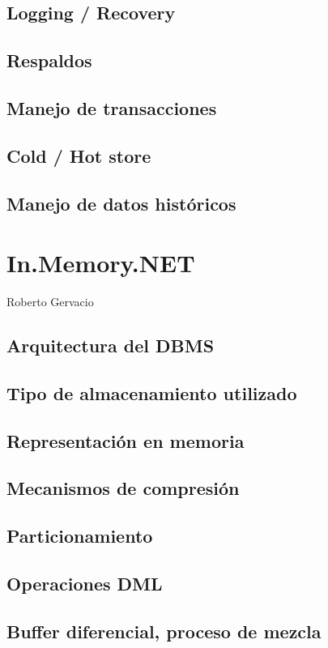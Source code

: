 \documentclass{acmart}
\begin{document}
\subsection{Logging / Recovery}
\subsection{Respaldos}
\subsection{Manejo de transacciones}
\subsection{Cold / Hot store}
\subsection{Manejo de datos históricos}
\newpage

\section{In.Memory.NET}
Roberto Gervacio
\subsection{Arquitectura del DBMS}
\subsection{Tipo de almacenamiento utilizado}
\subsection{Representación en memoria}
\subsection{Mecanismos de compresión}
\subsection{Particionamiento}
\subsection{Operaciones DML}
\subsection{Buffer diferencial, proceso de mezcla}
\end{document}
